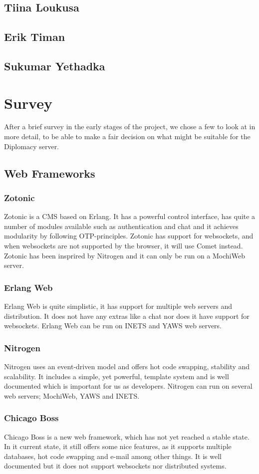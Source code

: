 \documentclass[11pt,a4paper]{report}
\begin{document}
\section{Tiina Loukusa}
\section{Erik Timan}
\section{Sukumar Yethadka}

\chapter{Survey}
After a brief survey in the early stages of the project, we chose a few to look
at in more detail, to be able to make a fair decision on what might be suitable
for the Diplomacy server.
\section{Web Frameworks}
\subsection{Zotonic}
Zotonic is a CMS based on Erlang. It has a powerful control interface, has
quite a number of modules available such as authentication and chat and it
achieves modularity by following OTP-principles. Zotonic has support for
websockets, and when websockets are not supported by the browser, it will use
Comet instead. Zotonic has been insprired by Nitrogen and it can only be run
on a MochiWeb server.
\subsection{Erlang Web}
Erlang Web is quite simplistic, it has support for multiple web servers and
distribution. It does not have any extras like a chat nor does it have support
for websockets. Erlang Web can be run on INETS and YAWS web servers.
\subsection{Nitrogen}
Nitrogen uses an event-driven model and offers hot code swapping, stability
and scalability. It includes a simple, yet powerful, template system and is
well documented which is important for us as developers. Nitrogen can run on
several web servers; MochiWeb, YAWS and INETS.
\subsection{Chicago Boss}
Chicago Boss is a new web framework, which has not yet reached a stable state.
In it current state, it still offers some nice features, as it supports multiple
databases, hot code swapping and e-mail among other things. It is well
documented but it does not support websockets nor distributed systems.
\end{document}
